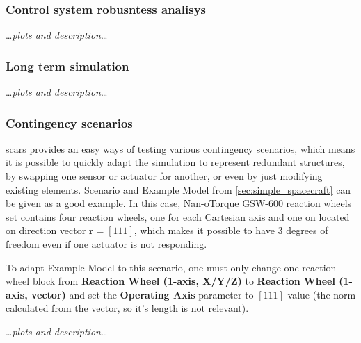     \subsubsection{Control system robusntess analisys}
    
        \dots\textit{plots and description}\dots
        

    \subsubsection{Long term simulation}
        \dots\textit{plots and description}\dots

    \subsubsection{Contingency scenarios}
        \ac{scars} provides an easy ways of testing various contingency scenarios, which means it is possible to quickly adapt the simulation to represent redundant structures, by swapping one sensor or actuator for another, or even by just modifying existing elements. Scenario and Example Model from \autoref{sec:simple_spacecraft} can be given as a good example. In this case,  Nan-oTorque GSW-600 reaction wheels set contains four reaction wheels, one for each Cartesian axis and one on located on direction vector $\textbf{r} = [1 1 1]$, which makes it possible to have 3 degrees of freedom even if one actuator is not responding.

        To adapt Example Model to this scenario, one must only change one reaction wheel block from \textbf{Reaction Wheel (1-axis, X/Y/Z)} to \textbf{Reaction Wheel (1-axis, vector)} and set the \textbf{Operating Axis} parameter to $[1 1 1]$ value (the norm calculated from the vector, so it's length is not relevant).


        \dots\textit{plots and description}\dots

